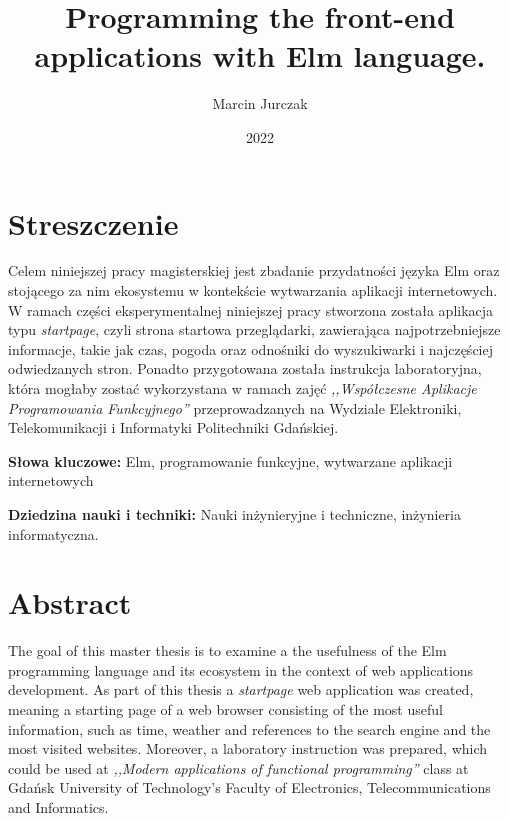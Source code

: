 \documentclass[twoside,a4paper]{report}
\begin{document}


\title{Programming the front-end applications with Elm language.}
\author{Marcin Jurczak}
\date{2022}

\maketitle
{}


\chapter*{Streszczenie}
\noindent
Celem niniejszej pracy magisterskiej jest zbadanie przydatności języka Elm oraz stojącego za nim ekosystemu w kontekście wytwarzania aplikacji internetowych.
W ramach części eksperymentalnej niniejszej pracy stworzona została aplikacja typu \textit{startpage}, czyli strona startowa przeglądarki, zawierająca najpotrzebniejsze informacje, takie jak czas, pogoda oraz odnośniki do wyszukiwarki i najczęściej odwiedzanych stron.
Ponadto przygotowana została instrukcja laboratoryjna, która mogłaby zostać wykorzystana w ramach zajęć \textit{,,Współczesne Aplikacje Programowania Funkcyjnego''} przeprowadzanych na Wydziale Elektroniki, Telekomunikacji i Informatyki Politechniki Gdańskiej.

\textbf{Słowa kluczowe:} Elm, programowanie funkcyjne, wytwarzane aplikacji internetowych

\textbf{Dziedzina nauki i techniki: }Nauki inżynieryjne i techniczne, inżynieria informatyczna.

\vspace{80pt}
{\let\clearpage\relax\chapter*{Abstract}}
\noindent
The goal of this master thesis is to examine a the usefulness of the Elm programming language and its ecosystem in the context of web applications development.
As part of this thesis a \textit{startpage} web application was created, meaning a starting page of a web browser consisting of the most useful information, such as time, weather and references to the search engine and the most visited websites.
Moreover, a laboratory instruction was prepared, which could be used at \textit{,,Modern applications of functional programming''} class at Gdańsk University of Technology’s Faculty of Electronics, Telecommunications and Informatics.
\end{document}
